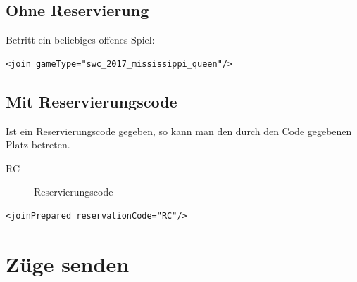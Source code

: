 \documentclass[12pt,a4paper, ngerman, oneside]{scrartcl}
\begin{document}
\subsection{Ohne Reservierung}
Betritt ein beliebiges offenes Spiel:
\begin{verbatim}
<join gameType="swc_2017_mississippi_queen"/>
\end{verbatim}
\subsection{Mit Reservierungscode}
Ist ein Reservierungscode gegeben, so kann man den durch den Code gegebenen Platz betreten.
\begin{description}
\item[RC] Reservierungscode
\end{description}
\begin{verbatim}
<joinPrepared reservationCode="RC"/>
\end{verbatim}

\section{Züge senden}
\end{document}
